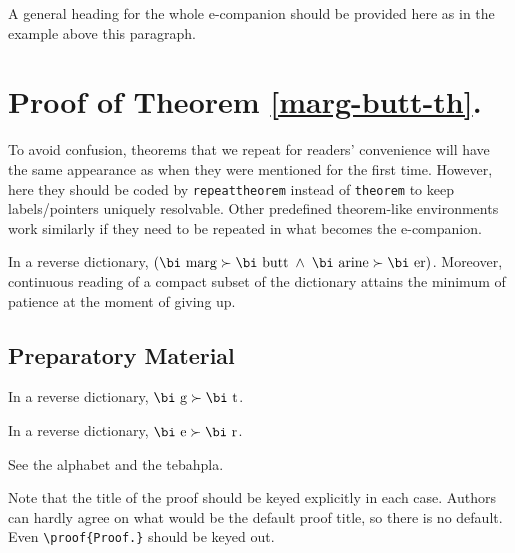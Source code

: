 \documentclass[opre,nonblindrev]{informs3}
\begin{document}
\ECSwitch



A general heading for the whole e-companion should be provided here as in the example above this paragraph.

\section{Proof of Theorem \ref{marg-butt-th}.}

To avoid confusion, theorems that we repeat for readers' convenience
will have the same appearance as when they were mentioned for the first
time. However, here they should be coded by \verb+repeattheorem+ instead
of \verb+theorem+ to keep labels/pointers uniquely resolvable. Other predefined theorem-like
environments work similarly if they need to be repeated in what becomes the \mbox{e-companion.}


\begin{repeattheorem}[Theorem 1.]
In a reverse dictionary, $(\mbox{\bi marg}\succ\mbox{\bi butt\/}\; \land\;  
\mbox{\bi arine}\succ\mbox{\bi er})$.
Moreover, continuous reading of a compact subset of the dictionary
attains the minimum of patience at the moment of giving up.
\end{repeattheorem}

\subsection{Preparatory Material}

\begin{lemma}
\label{aux-lem1}
In a reverse dictionary, $\mbox{\bi g}\succ\mbox{\bi t\/}$.
\end{lemma}

\begin{lemma}
\label{aux-lem2}
In a reverse dictionary, $\mbox{\bi e}\succ\mbox{\bi r\/}$.
\end{lemma}

 See the alphabet and the tebahpla.\Halmos
\endproof

\begin{remark} 
Note that the title of the proof should be keyed
explicitly in each case. Authors can hardly agree on what would be the
default proof title, so there is no default. Even \verb+\proof{Proof.}+ should be keyed out. 
\end{remark}
\end{document}
